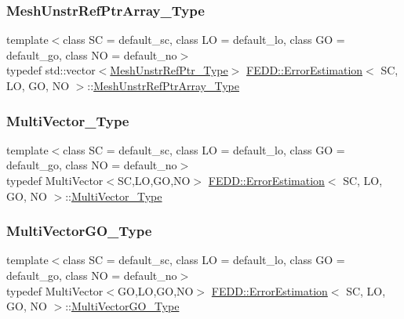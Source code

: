 \subsubsection{\texorpdfstring{Mesh\+Unstr\+Ref\+Ptr\+Array\+\_\+\+Type}{MeshUnstrRefPtrArray\_Type}}
{\footnotesize\ttfamily template$<$class SC  = default\+\_\+sc, class LO  = default\+\_\+lo, class GO  = default\+\_\+go, class NO  = default\+\_\+no$>$ \\
typedef std\+::vector$<$\hyperlink{classFEDD_1_1ErrorEstimation_a541e398a65d9618f8f316a941b57f5cb}{Mesh\+Unstr\+Ref\+Ptr\+\_\+\+Type}$>$ \hyperlink{classFEDD_1_1ErrorEstimation}{F\+E\+D\+D\+::\+Error\+Estimation}$<$ SC, LO, GO, NO $>$\+::\hyperlink{classFEDD_1_1ErrorEstimation_a007f3451c1ea266178a87e3649f29e97}{Mesh\+Unstr\+Ref\+Ptr\+Array\+\_\+\+Type}}

\mbox{\label{classFEDD_1_1ErrorEstimation_a1c6fa9610a1e5e887e5a88ab33f1c792}} 
\subsubsection{\texorpdfstring{Multi\+Vector\+\_\+\+Type}{MultiVector\_Type}}
{\footnotesize\ttfamily template$<$class SC  = default\+\_\+sc, class LO  = default\+\_\+lo, class GO  = default\+\_\+go, class NO  = default\+\_\+no$>$ \\
typedef Multi\+Vector$<$SC,LO,GO,NO$>$ \hyperlink{classFEDD_1_1ErrorEstimation}{F\+E\+D\+D\+::\+Error\+Estimation}$<$ SC, LO, GO, NO $>$\+::\hyperlink{classFEDD_1_1ErrorEstimation_a1c6fa9610a1e5e887e5a88ab33f1c792}{Multi\+Vector\+\_\+\+Type}}

\mbox{\label{classFEDD_1_1ErrorEstimation_a450a5b3954044f55167783097b934bbd}} 
\subsubsection{\texorpdfstring{Multi\+Vector\+G\+O\+\_\+\+Type}{MultiVectorGO\_Type}}
{\footnotesize\ttfamily template$<$class SC  = default\+\_\+sc, class LO  = default\+\_\+lo, class GO  = default\+\_\+go, class NO  = default\+\_\+no$>$ \\
typedef Multi\+Vector$<$GO,LO,GO,NO$>$ \hyperlink{classFEDD_1_1ErrorEstimation}{F\+E\+D\+D\+::\+Error\+Estimation}$<$ SC, LO, GO, NO $>$\+::\hyperlink{classFEDD_1_1ErrorEstimation_a450a5b3954044f55167783097b934bbd}{Multi\+Vector\+G\+O\+\_\+\+Type}}

